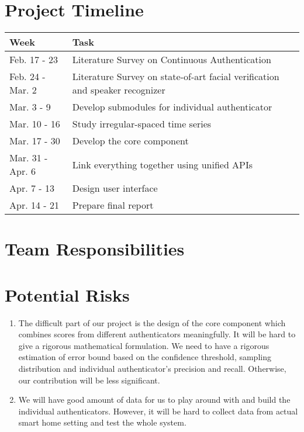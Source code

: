 \documentclass[a4paper, 11pt]{article}
\begin{document}
\section*{Project Timeline}
\begin{table}[H]
\begin{tabular}{|l|l|}
\hline
Week             & Task                                                                         \\ \hline
Feb. 17 - 23     & Literature Survey on Continuous Authentication                               \\ \hline
Feb. 24 - Mar. 2 & Literature Survey on state-of-art facial verification and speaker recognizer \\ \hline
Mar. 3 - 9       & Develop submodules for individual authenticator                              \\ \hline
Mar. 10 - 16     & Study irregular-spaced time series                                           \\ \hline
Mar. 17 - 30     & Develop the core component                                                   \\ \hline
Mar. 31 - Apr. 6 & Link everything together using unified APIs                                  \\ \hline
Apr. 7 - 13      & Design user interface                                                        \\ \hline
Apr. 14 - 21     & Prepare final report                                                         \\ \hline
\end{tabular}
\end{table}

\section*{Team Responsibilities}

\section*{Potential Risks}
\begin{enumerate}
\item The difficult part of our project is the design of the core component which combines scores from different authenticators meaningfully. It will be hard to give a rigorous mathematical formulation. We need to have a rigorous estimation of error bound based on the confidence threshold, sampling distribution and individual authenticator’s precision and recall. Otherwise, our contribution will be less significant.
\item We will have good amount of data for us to play around with and build the individual authenticators. However, it will be hard to collect data from actual smart home setting and test the whole system.
\end{enumerate}
\end{document}
